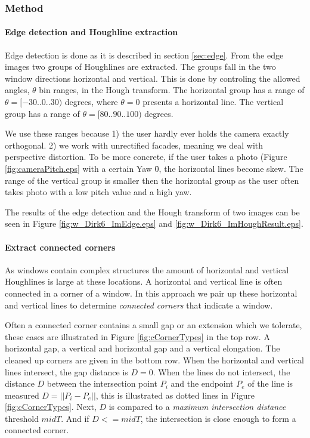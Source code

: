 \subsubsection{Method}
\paragraph{Edge detection and Houghline extraction}
Edge detection is done as it is described in section \ref{sec:edge}.
From the edge images two groups of Houghlines are extracted. 
The groups fall in the two window directions horizontal and vertical.
This is done by controling the allowed angles, $\theta$ bin ranges, in the Hough transform.
The horizontal group has a range of $\theta = [-30..0..30)$ degrees, where $\theta = 0$ presents a horizontal line. 
The vertical group has a range of $\theta = [80..90..100)$ degrees. 

We use these ranges because 1) the user hardly ever holds the camera exactly
orthogonal.  2) we work with unrectified facades, meaning we deal with
perspective distortion.  To be more concrete, if the user takes a photo (Figure
\ref{fig:cameraPitch.eps} with a certain Yaw \= 0, the horizontal lines become
skew.  The range of the vertical group is smaller then the horizontal group as
the user often takes photo with a low pitch value and a high yaw.

The results of the edge detection and the Hough transform of two images can be seen in Figure \ref{fig:w_Dirk6_ImEdge.eps} and
 \ref{fig:w_Dirk6_ImHoughResult.eps}.

\paragraph{Extract connected corners}
 As windows contain complex structures
the amount of horizontal and vertical Houghlines is large at these locations.
A horizontal and vertical line is often connected in a corner of a window.  In
this approach we pair up these horizontal and vertical lines to determine
\emph{connected corners} that indicate a window.

Often a connected corner contains a small gap or an extension which we tolerate,
these cases are illustrated in Figure \ref{fig:cCornerTypes} in the top row.
A horizontal gap, a vertical and horizontal gap and a vertical elongation. The
cleaned up corners are given in the bottom row.  When the horizontal and
vertical lines intersect, the gap distance is $D=0$.  When the lines do not
intersect, the distance $D$ between the intersection point $P_i$ and the endpoint $P_e$ of the
line is measured $D = ||P_i-P_e||$, this is illustrated as dotted lines in Figure
\ref{fig:cCornerTypes}.  Next, $D$ is compared to a \emph{maximum intersection
distance} threshold $midT$.  And if $D<=midT$, the intersection is close enough
to form a connected corner.\\

